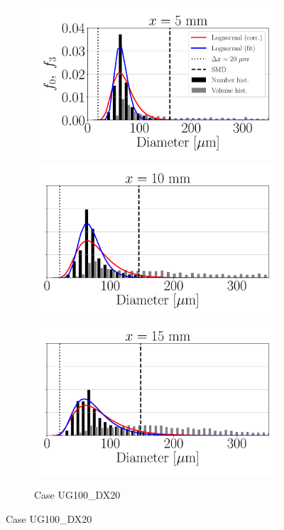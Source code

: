 \begin{figure}[ht]
\begin{subfigure}[b]{1.1\textwidth}
	\flushleft
   \includegraphics[scale=0.225]{./part2_developments/figures_ch5_resolved_JICF/SPRAY_characterization/histograms_size_volume/UG100_DX20_x05_histograms}
   \includegraphics[scale=0.225]{./part2_developments/figures_ch5_resolved_JICF/SPRAY_characterization/histograms_size_volume/UG100_DX20_x10_histograms}
   \includegraphics[scale=0.225]{./part2_developments/figures_ch5_resolved_JICF/SPRAY_characterization/histograms_size_volume/UG100_DX20_x15_histograms}
	\caption{Case UG100\_DX20}
\end{subfigure}


\end{figure}
